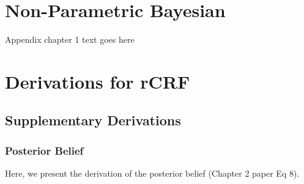 \chapter{Non-Parametric Bayesian}
Appendix chapter 1 text goes here


\chapter{Derivations for rCRF}
\section{Supplementary Derivations}
\subsection{Posterior Belief}
Here, we present the derivation of the posterior belief (Chapter 2 paper Eq 8).

